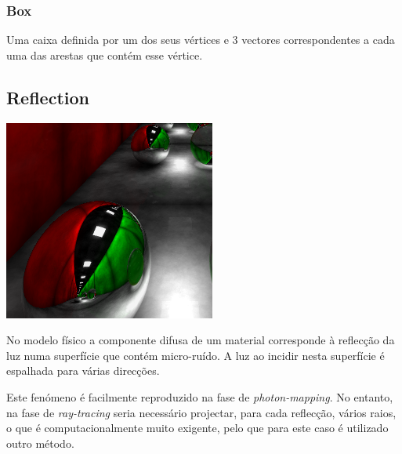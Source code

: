 \documentclass[a4paper]{article}
\begin{document}
\subsubsection{Box}
\indent \indent Uma caixa definida por um dos seus vértices e 3 vectores correspondentes a cada uma das 
arestas que contém esse vértice.

\cleardoublepage
\subsection{Reflection}
\label{sec:reflection}

\begin{center}
	\includegraphics[scale=0.50]{images/reflection.png}
	\label{fig:reflection}
\end{center}

\indent No modelo físico a componente difusa de um material corresponde à reflecção da luz numa superfície
que contém micro-ruído. A luz ao incidir nesta superfície é espalhada para várias direcções. 

\indent Este fenómeno é facilmente reproduzido na fase de \emph{photon-mapping}.
No entanto, na fase de \emph{ray-tracing} seria necessário projectar, para cada reflecção, vários raios, o que
é computacionalmente muito exigente, pelo que para este caso é utilizado outro método.
\end{document}

